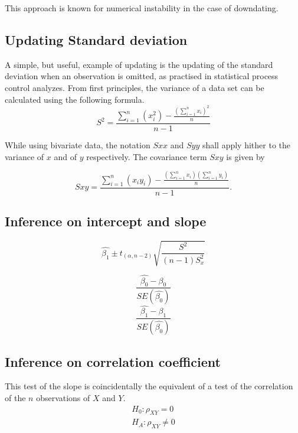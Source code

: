 \documentclass[12pt, a4paper]{report}
\theoremstyle{plain}
\theoremstyle{definition}
\theoremstyle{remark}
\begin{document}
	This approach is known for numerical instability in the case of
	downdating.
	\subsection{Updating Standard deviation}
	A simple, but useful, example of updating is the updating of the standard deviation when an observation is omitted, as practised in statistical process control analyzes. From first principles, the variance of a data set can be calculated using the following formula.
	\begin{equation}
	S^{2}=\frac{\sum_{i=1}^{n}(x_{i}^{2})-\frac{(\sum_{i=1}^{n}x_{i})^{2}}{n}}{n-1}
	\end{equation}
	
	While using bivariate data, the notation $Sxx$ and $Syy$ shall apply hither to the variance of $x$ and of $y$ respectively. The covariance term $Sxy$ is given by
	
	\begin{equation}
	Sxy=\frac{\sum_{i=1}^{n}(x_{i}y_{i})-\frac{(\sum_{i=1}^{n}x_{i})(\sum_{i=1}^{n}y_{i})}{n}}{n-1}.
	\end{equation}
	
	\subsection{Inference on intercept and slope}
	\begin{equation}
	\hat{\beta_{1}} \pm t_{(\alpha, n-2) }
	\sqrt{\frac{S^2}{(n-1)S^{2}_{x}}}
	\end{equation}
	
	\begin{equation}
	\frac{\hat{\beta_{0}}-\beta_{0}}{SE(\hat{\beta_{0}})}
	\end{equation}
	\begin{equation}
	\frac{\hat{\beta_{1}}-\beta_{1}}{SE(\hat{\beta_{0}})}
	\end{equation}
	
	
	\subsection{Inference on correlation coefficient} This test of
	the slope is coincidentally the equivalent of a test of the
	correlation of the $n$ observations of $X$ and $Y$.
	\begin{eqnarray}
	H_{0}: \rho_{XY} = 0 \nonumber \\
	H_{A}: \rho_{XY} \ne 0 \nonumber \\
	\end{eqnarray}
	
\end{document}
